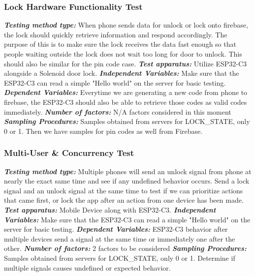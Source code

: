 \subsubsection{Lock Hardware Functionality Test}
\textbf{\textit{Testing method type:}} When phone sends data for unlock or lock onto firebase, the lock should quickly retrieve information and respond accordingly. The purpose of this is to make sure the lock receives the data fast enough so that people waiting outside the lock does not wait too long for door to unlock. This should also be similar for the pin code case.
\newline
\textbf{\textit{Test apparatus:}} Utilize ESP32-C3 alongside a Solenoid door lock.
\newline
\textbf{\textit{Independent Variables:}} Make sure that the ESP32-C3 can read a simple "Hello world" on the server for basic testing.
\newline
\textbf{\textit{Dependent Variables:}} Everytime we are generating a new code from phone to firebase, the ESP32-C3 should also be able to retrieve those codes as valid codes immediately.
\newline
\textbf{\textit{Number of factors:}} N/A factors considered in this moment
\newline
\textbf{\textit{Sampling Procedures:}} Samples obtained from servers for LOCK\_STATE, only 0 or 1. Then we have samples for pin codes as well from Firebase.
\newline

\subsubsection{Multi-User \& Concurrency Test}
\textbf{\textit{Testing method type:}} Multiple phones will send an unlock signal from phone at nearly the exact same time and see if any undefined behavior occurs. Send a lock signal and an unlock signal at the same time to test if we can prioritize actions that came first, or lock the app after an action from one device has been made.
\newline
\textbf{\textit{Test apparatus:}} Mobile Device along with ESP32-C3.
\newline
\textbf{\textit{Independent Variables:}} Make sure that the ESP32-C3 can read a simple "Hello world" on the server for basic testing.
\newline
\textbf{\textit{Dependent Variables:}} ESP32-C3 behavior after multiple devices send a signal at the same time or immediately one after the other.
\newline
\textbf{\textit{Number of factors:}} 2 factors to be considered
\newline
\textbf{\textit{Sampling Procedures:}} Samples obtained from servers for LOCK\_STATE, only 0 or 1. Determine if multiple signals causes undefined or expected behavior.

